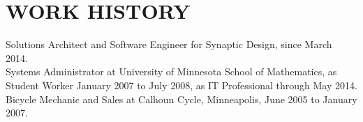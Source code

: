 
\section{WORK HISTORY}
    Solutions Architect and Software Engineer for Synaptic Design, since
    March 2014.
    \vspace{1 mm} \\
    Systems Administrator at University of Minnesota School of
    Mathematics, as Student Worker January 2007 to July 2008, as IT Professional
    through May 2014.
    \vspace{1 mm} \\
    Bicycle Mechanic and Sales at Calhoun Cycle, Minneapolis, June 2005 to
    January 2007.

